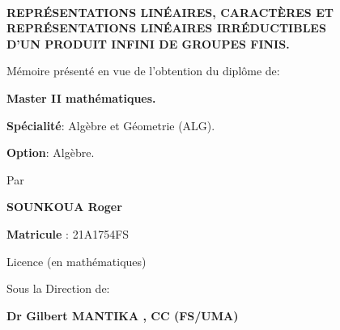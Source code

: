 \documentclass[a4paper, 14pt]{report}
\begin{document}
\begin{center}

\begin{tcolorbox}[
	colframe=blue!70,      %
	colback=blue!10,       %
	coltitle=black,        %
	boxrule=1mm,         %
	arc=5mm,               %
	width=\textwidth ,      %
	center                 %
	]
	\centering
	
	{\textbf{\large \\
			 REPRÉSENTATIONS LINÉAIRES, CARACTÈRES ET \\
			REPRÉSENTATIONS LINÉAIRES IRRÉDUCTIBLES \\
			D'UN PRODUIT INFINI DE GROUPES FINIS.\\ }}
\end{tcolorbox}

\vspace{1cm}


{\fontsize{12}{10}\selectfont

\vspace{0.5cm}
Mémoire présenté en vue de l’obtention du diplôme de:
\begin{center}
	\textbf{Master II mathématiques.}
\end{center}

\textbf{Spécialité}: Algèbre et Géometrie (ALG).

\begin{center}
\textbf{Option}: Algèbre.
\end{center}

\begin{center}
Par
\end{center}

\begin{center}
\textbf{SOUNKOUA Roger}
\end{center}

\begin{center}
\textbf{Matricule }: 21A1754FS
\end{center}

\begin{center}
Licence (en mathématiques)
\end{center}

\begin{center}
Sous la Direction de:
\end{center}

\begin{center}
\textbf{ Dr Gilbert MANTIKA , CC (FS/UMA)}
\end{center}



}
\end{center}
\end{document}
